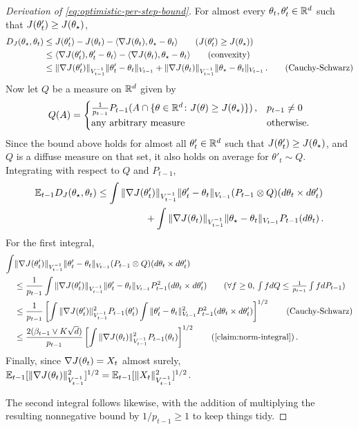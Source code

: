 \begin{proof}[Derivation of \cref{eq:optimistic-per-step-bound}]
  For almost every $\theta_t,\theta_t' \in \mathbb{R}^d$ such that $J(\theta_t') \geq J(\theta_\star)$,
\begin{align}
  \Dj(\thetaopt, \thetat) &\leq J(\thetat') - J(\thetat) - \langle \nabla J(\thetat), \thetaopt - \thetat \rangle \tag{$J(\theta'_t) \geq J(\thetaopt)$}\\
    &\leq \langle \nabla J(\thetat'), \thetat' - \thetat \rangle - \langle \nabla J(\thetat), \thetaopt - \thetat \rangle \tag{convexity}\\
    &\leq \vinvnorm{\nabla J(\thetat')} \vnorm{\thetat' - \thetat} + \vinvnorm{\nabla J(\thetat)} \vnorm{\thetaopt - \thetat}\,. \tag{Cauchy-Schwarz}
\end{align}
Now let $Q$ be a measure on $\mathbb{R}^d$ given by 
$$
Q(A) = \begin{cases}
  \tfrac{1}{p_{t-1}} P_{t-1}(A \cap \{\theta \in \mathbb{R}^d \colon J(\theta) \geq J(\theta_\star)\})\,, & p_{t-1} \neq 0 \\
  \text{any arbitrary measure} & \text{otherwise.} 
\end{cases} 
$$
Since the bound above holds for almost all $\theta'_t \in \mathbb{R}^d$ such that $J(\theta'_t) \geq J(\theta_\star)$, and $Q$ is a diffuse measure on that set, it also holds on average for $\theta'_t \sim Q$. Integrating with respect to $Q$ and $P_{t-1}$, 
\begin{align*}
  \mathbb{E}_{t-1} D_{J}(\theta_\star, \theta_t) &\leq \int \|\nabla J(\theta_t')\|_{V_{t-1}^{-1}} \|\theta_t' - \theta_t\|_{V_{t-1}} (P_{t-1}\otimes Q)(d\theta_t \times d\theta_t') \\
  &\hspace{5em} + \int \|\nabla J(\theta_t)\|_{V_{t-1}^{-1}} \|\theta_\star - \theta_t\|_{V_{t-1}} P_{t-1}(d\theta_t)\,.
\end{align*}
For the first integral,
\begin{align}
  \int &\vinvnorm{\nabla J(\thetat')} \vnorm{\thetat' - \thetat} (P_{t-1}\otimes Q)(d\thetat \times d\thetat') \label{eq:integral-cs-bound}\\
  &\leq \frac{1}{p_{t-1}}\int \vinvnorm{\nabla J(\thetat')} \vnorm{\thetat' - \thetat} P_{t-1}^2(d\thetat \times d\thetat')  \tag{$\forall f \geq 0$, $\int f dQ \leq \frac{1}{p_{t-1}} \int f dP_{t-1}$} \\
  &\leq \frac{1}{p_{t-1}} \left[ \int \vinvnorm{\nabla J(\thetat')}^2 P_{t-1}(\thetat') \int \vnorm{\thetat' - \thetat}^2 P_{t-1}^2(d\thetat \times d\thetat')  \right]^{1/2} \tag{Cauchy-Schwarz}\\
  &\leq \frac{2(\bet \vee K\sqrt{d})}{p_{t-1}} \left[ \int \vinvnorm{\nabla J(\thetat)}^2 P_{t-1}(\thetat)  \right]^{1/2} \tag{\cref{claim:norm-integral}}\,.
\end{align}
Finally, since $\nabla J(\theta_t) = X_t$ almost surely, $\mathbb{E}_{t-1}[\|\nabla J(\theta_t)\|_{V_{t-1}^{-1}}^2]^{1/2} = \mathbb{E}_{t-1}[\|X_t\|_{V_{t-1}^{-1}}^2]^{1/2}$.

The second integral follows likewise, with the addition of multiplying the resulting nonnegative bound by $1/p_{t-1} \geq 1$ to keep things tidy. 
\end{proof}

